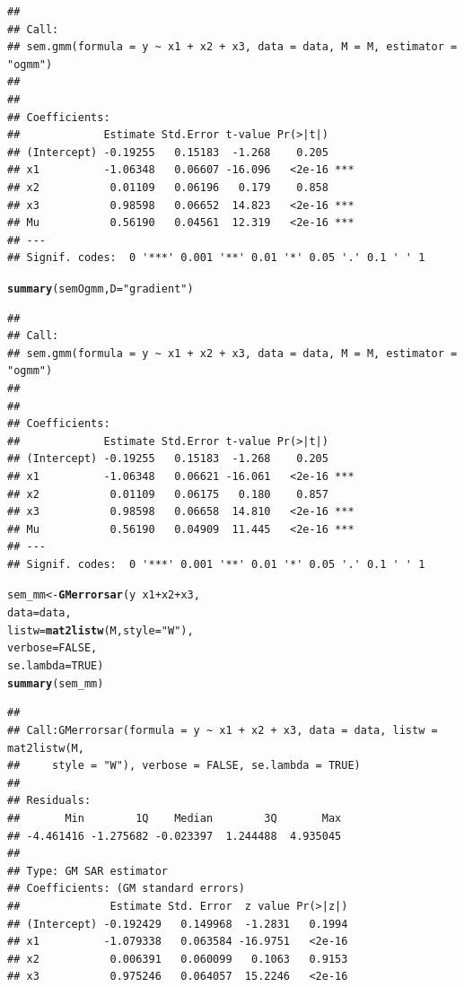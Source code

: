 \documentclass[english,12pt]{book}\usepackage[]{graphicx}\usepackage[]{xcolor}
\makeatletter
\newcommand{\hlnum}[1]{\textcolor[rgb]{0.686,0.059,0.569}{#1}}%
\newcommand{\hlstr}[1]{\textcolor[rgb]{0.192,0.494,0.8}{#1}}%
\newcommand{\hlopt}[1]{\textcolor[rgb]{0,0,0}{#1}}%
\newcommand{\hlstd}[1]{\textcolor[rgb]{0.345,0.345,0.345}{#1}}%
\newcommand{\hlkwb}[1]{\textcolor[rgb]{0.69,0.353,0.396}{#1}}%
\newcommand{\hlkwc}[1]{\textcolor[rgb]{0.333,0.667,0.333}{#1}}%
\newcommand{\hlkwd}[1]{\textcolor[rgb]{0.737,0.353,0.396}{\textbf{#1}}}%
\newenvironment{kframe}{%
 \def\at@end@of@kframe{}%
 \ifinner\ifhmode%
  \def\at@end@of@kframe{\end{minipage}}%
  \begin{minipage}{\columnwidth}%
 \fi\fi%
 \def\FrameCommand##1{\hskip\@totalleftmargin \hskip-\fboxsep
 \colorbox{shadecolor}{##1}\hskip-\fboxsep
     \hskip-\linewidth \hskip-\@totalleftmargin \hskip\columnwidth}%
 \MakeFramed {\advance\hsize-\width
   \@totalleftmargin\z@ \linewidth\hsize
   \@setminipage}}%
 {\par\unskip\endMakeFramed%
 \at@end@of@kframe}
\newenvironment{knitrout}{}{} %
\makeatother
\begin{document}
\begin{knitrout}
\begin{kframe}
\begin{verbatim}
## 
## Call:
## sem.gmm(formula = y ~ x1 + x2 + x3, data = data, M = M, estimator = "ogmm")
## 
## 
## Coefficients:
##             Estimate Std.Error t-value Pr(>|t|)    
## (Intercept) -0.19255   0.15183  -1.268    0.205    
## x1          -1.06348   0.06607 -16.096   <2e-16 ***
## x2           0.01109   0.06196   0.179    0.858    
## x3           0.98598   0.06652  14.823   <2e-16 ***
## Mu           0.56190   0.04561  12.319   <2e-16 ***
## ---
## Signif. codes:  0 '***' 0.001 '**' 0.01 '*' 0.05 '.' 0.1 ' ' 1
\end{verbatim}
\begin{alltt}
\hlkwd{summary}\hlstd{(semOgmm,} \hlkwc{D} \hlstd{=} \hlstr{"gradient"}\hlstd{)}
\end{alltt}
\begin{verbatim}
## 
## Call:
## sem.gmm(formula = y ~ x1 + x2 + x3, data = data, M = M, estimator = "ogmm")
## 
## 
## Coefficients:
##             Estimate Std.Error t-value Pr(>|t|)    
## (Intercept) -0.19255   0.15183  -1.268    0.205    
## x1          -1.06348   0.06621 -16.061   <2e-16 ***
## x2           0.01109   0.06175   0.180    0.857    
## x3           0.98598   0.06658  14.810   <2e-16 ***
## Mu           0.56190   0.04909  11.445   <2e-16 ***
## ---
## Signif. codes:  0 '***' 0.001 '**' 0.01 '*' 0.05 '.' 0.1 ' ' 1
\end{verbatim}
\begin{alltt}
\hlstd{sem_mm}    \hlkwb{<-} \hlkwd{GMerrorsar}\hlstd{(y} \hlopt{~} \hlstd{x1} \hlopt{+} \hlstd{x2} \hlopt{+} \hlstd{x3,}
                        \hlkwc{data} \hlstd{= data,}
                        \hlkwc{listw} \hlstd{=} \hlkwd{mat2listw}\hlstd{(M,} \hlkwc{style} \hlstd{=} \hlstr{"W"}\hlstd{),}
                        \hlkwc{verbose} \hlstd{=} \hlnum{FALSE}\hlstd{,}
                        \hlkwc{se.lambda} \hlstd{=} \hlnum{TRUE}\hlstd{)}
\hlkwd{summary}\hlstd{(sem_mm)}
\end{alltt}
\begin{verbatim}
## 
## Call:GMerrorsar(formula = y ~ x1 + x2 + x3, data = data, listw = mat2listw(M, 
##     style = "W"), verbose = FALSE, se.lambda = TRUE)
## 
## Residuals:
##       Min        1Q    Median        3Q       Max 
## -4.461416 -1.275682 -0.023397  1.244488  4.935045 
## 
## Type: GM SAR estimator
## Coefficients: (GM standard errors) 
##              Estimate Std. Error  z value Pr(>|z|)
## (Intercept) -0.192429   0.149968  -1.2831   0.1994
## x1          -1.079338   0.063584 -16.9751   <2e-16
## x2           0.006391   0.060099   0.1063   0.9153
## x3           0.975246   0.064057  15.2246   <2e-16

\end{verbatim}
\end{kframe}
\end{knitrout}
\end{document}
